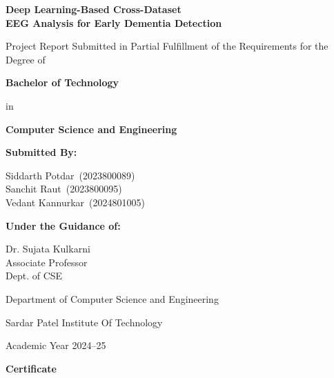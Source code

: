 \documentclass[11pt,a4paper]{article}
\newcommand{\ProjTitle}{Deep Learning-Based Cross-Dataset\\
EEG Analysis for Early Dementia Detection}
\newcommand{\StudentA}{Siddarth Potdar}
\newcommand{\StudentARoll}{2023800089}
\newcommand{\StudentB}{Sanchit Raut}
\newcommand{\StudentBRoll}{2023800095}
\newcommand{\StudentC}{Vedant Kannurkar}
\newcommand{\StudentCRoll}{2024801005}
\newcommand{\GuideName}{Dr. Sujata Kulkarni}
\newcommand{\GuideRank}{Associate Professor}
\newcommand{\DeptShort}{Dept. of CSE}
\newcommand{\DeptName}{Department of Computer Science and Engineering}
\newcommand{\CollegeName}{Sardar Patel Institute Of Technology}
\newcommand{\Degree}{Bachelor of Technology}
\newcommand{\Branch}{Computer Science and Engineering}
\newcommand{\AcadYear}{2024--25}
\begin{document}

\begin{titlepage}\centering\thispagestyle{empty}
\vspace*{18mm}

{\LARGE\bfseries \ProjTitle \par}

\vspace{20mm}
{\normalsize Project Report Submitted in Partial Fulfillment of the
Requirements for the Degree of\par}
\vspace{4mm}
{\large\bfseries \Degree\par}
\vspace{2mm}
{\normalsize in\par}
\vspace{2mm}
{\large\bfseries \Branch\par}

\vspace{18mm}
{\bfseries Submitted By:\par}
\vspace{3mm}
{\normalsize
\StudentA\ (\StudentARoll)\\[1mm]
\StudentB\ (\StudentBRoll)\\[1mm]
\StudentC\ (\StudentCRoll)\par}

\vspace{10mm}
{\bfseries Under the Guidance of:\par}
\vspace{3mm}
{\normalsize \GuideName\\[1mm] \GuideRank\\[1mm] \DeptShort\par}

\vfill
{\normalsize \DeptName\par}
{\normalsize \CollegeName\par}
\vspace{2mm}
{\normalsize Academic Year \AcadYear\par}
\vspace{8mm}
\end{titlepage}

\clearpage\thispagestyle{empty}
\begin{center}{\Large\bfseries Certificate\par}\end{center}
\vspace{10mm}
\end{document}
